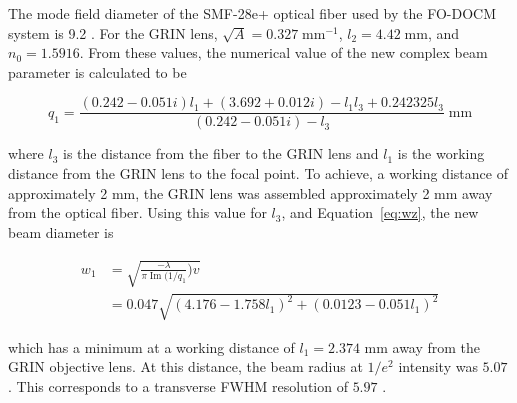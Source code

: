 The mode field diameter of the SMF-28e+ optical fiber used by the FO-DOCM system is 9.2 \micron. For the GRIN lens, $\sqrt{A} = 0.327 \; \mathrm{mm}^{-1}$, $l_2 = 4.42 \; \mathrm{mm}$, and $n_0 = 1.5916$. From these values, the numerical value of the new complex beam parameter is calculated to be


\begin{equation}
q_1 = \frac{(0.242 - 0.051 i) l_1 + (3.692 + 0.012 i) - l_1 l_3 + 0.242325 l_3}{(0.242 -0.051 i) - l_3} \; \mathrm{mm}
\end{equation}

\noindent where $l_3$ is the distance from the fiber to the GRIN lens and $l_1$ is the working distance from the GRIN lens to the focal point. To achieve, a working distance of approximately 2 mm, the GRIN lens was assembled approximately 2 mm away from the optical fiber. Using this value for $l_3$, and Equation~\ref{eq:wz}, the new beam diameter is 

\begin{equation}
\begin{aligned}
 w_1 & = \sqrt{\frac{-\lambda}{\pi \operatorname{Im} (1/q_1})v} \\
 & = 0.047 \sqrt{(4.176 - 1.758 l_1)^2 + (0.0123 - 0.051 l_1)^2}
\end{aligned}
\end{equation}

\noindent which has a minimum at a working distance of $l_1 = 2.374$ mm away from the GRIN objective lens. At this distance, the beam radius at $1/e^2$ intensity was $5.07$ \micron. This corresponds to a transverse FWHM resolution of $5.97$ \micron.




